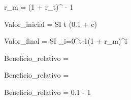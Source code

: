 
r_m = (1 + r_t)^ - 1

\newline
\newline

Valor_{inicial} = SI \cdot t \cdot (0.1 + c)

\newline
\newline

Valor_{final} = SI  \sum_{i=0}^{t-1}{(1 + r_m)^i}

\newline
\newline

Beneficio_{relativo} = 

\newline
\newline

Beneficio_{relativo} = 

\newline
\newline

\Rightarrow

Beneficio_{relativo} = 0.1 \cdot {} - 1
